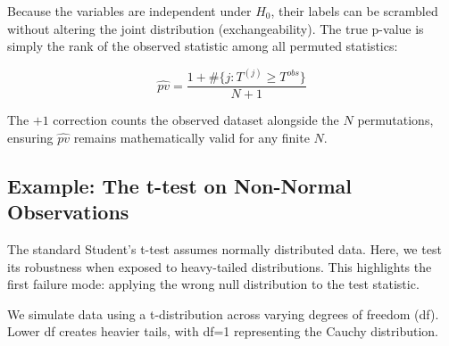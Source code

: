 \documentclass[
  letterpaper,
  DIV=11,
  numbers=noendperiod]{scrreprt}
\begin{document}
Because the variables are independent under \(H_0\), their labels can be
scrambled without altering the joint distribution (exchangeability). The
true p-value is simply the rank of the observed statistic among all
permuted statistics:

\[\widehat{pv} = \frac{1 + \#\{j : T^{(j)} \ge T^{obs}\}}{N + 1}\]

The \(+1\) correction counts the observed dataset alongside the \(N\)
permutations, ensuring \(\widehat{pv}\) remains mathematically valid for
any finite \(N\).

\subsection{Example: The t-test on Non-Normal
Observations}\label{example-the-t-test-on-non-normal-observations}

The standard Student's t-test assumes normally distributed data. Here,
we test its robustness when exposed to heavy-tailed distributions. This
highlights the first failure mode: applying the wrong null distribution
to the test statistic.

We simulate data using a t-distribution across varying degrees of
freedom (df). Lower df creates heavier tails, with df=1 representing the
Cauchy distribution.
\end{document}
